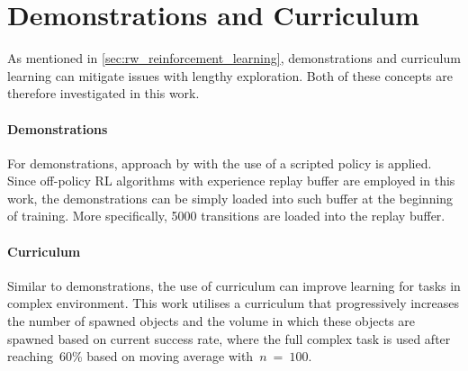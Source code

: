 \section{Demonstrations and Curriculum}

As mentioned in \autoref{sec:rw_reinforcement_learning}, demonstrations and curriculum learning can mitigate issues with lengthy exploration. Both of these concepts are therefore investigated in this work.

\paragraph{Demonstrations} For demonstrations, approach by \citet{kalashnikov_qt-opt_2018} with the use of a scripted policy is applied. Since off-policy RL algorithms with experience replay buffer are employed in this work, the demonstrations can be simply loaded into such buffer at the beginning of training. More specifically, 5000 transitions are loaded into the replay buffer.

\paragraph{Curriculum} Similar to demonstrations, the use of curriculum can improve learning for tasks in complex environment. This work utilises a curriculum that progressively increases the number of spawned objects and the volume in which these objects are spawned based on current success rate, where the full complex task is used after reaching~\(60\)\% based on moving average with~\(n\)~=~\(100\).
